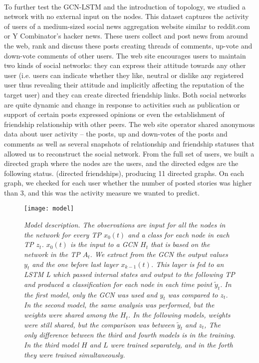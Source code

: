 \\To further test the GCN-LSTM and the introduction of topology, we studied a network with no external input on the nodes. This dataset captures the activity of users of a medium-sized social news aggregation website similar to reddit.com or Y Combinator’s hacker news. These users collect and post news from around the web, rank and discuss these posts creating threads of comments, up-vote and down-vote comments of other users. The web site encourages users to maintain two kinds of social networks: they can express their attitude towards any other user (i.e. users can indicate whether they like, neutral or dislike any registered user thus revealing their attitude and implicitly affecting the reputation of the target user) and they can create directed friendship links. Both social networks are quite dynamic and change in response to activities such as publication or support of certain posts expressed opinions or even the establishment of friendship relationship with other peers. The web site operator shared anonymous data about user activity – the posts, up and down-votes of the posts and comments as well as several snapshots of relationship and friendship statuses that allowed us to reconstruct the social network. From the full set of users, we built a directed graph where the nodes are the users, and the directed edges are the following status. (directed friendships), producing 11 directed graphs. On each graph, we checked for each user whether the number of posted stories was higher than 3, and this was the activity measure we wanted to predict.

\begin{figure}[h!]
    \texttt{[image: model]}
    \centering
    \caption{\textit{Model description. The observations are input for all the nodes in the network for every TP $x_{0}(t)$ and a class for each node in each TP $z_{t}$. $x_{0}(t)$ is the input to a GCN $H_{t}$ that is based on the network in the TP $A_{t}$. We extract from the GCN the output values $y_{t}$ and the one before last layer $x_{k-1}(t)$. This layer is fed to an LSTM L which passed internal states and output to the following TP and produced a classification for each node in each time point $\tilde{y}_{t}$. In the first model, only the GCN was used and $y_{t}$ was compared to $z_{t}$. In the second model, the same analysis was performed, but the weights were shared among the $H_{t}$. In the following models, weights were still shared, but the comparison was between $\tilde{y}_{t}$ and $z_{t}$, The only difference between the third and fourth models is in the training. In the third model $H$ and $L$ were trained separately, and in the forth they were trained simultaneously.}}
    \label{fig:model}
\end{figure}